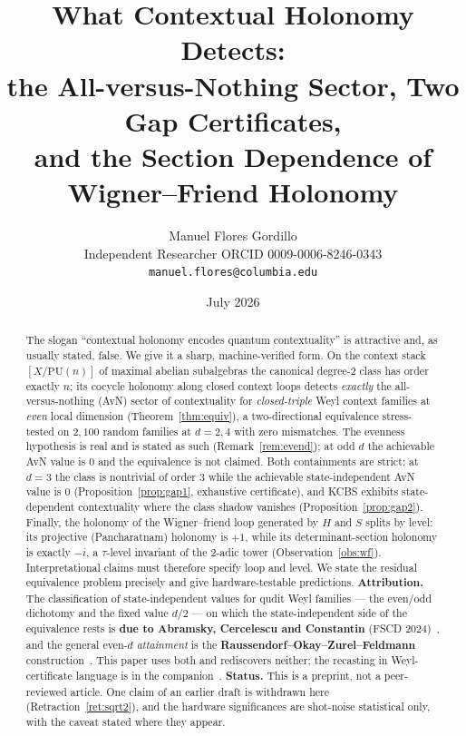 \documentclass[11pt]{article}
\title{What Contextual Holonomy Detects:\\ the All-versus-Nothing Sector, Two Gap Certificates,\\ and the Section Dependence of Wigner--Friend Holonomy}
\author{Manuel Flores Gordillo\\ \small Independent Researcher \quad ORCID 0009-0006-8246-0343\\ \small \texttt{manuel.flores@columbia.edu}}
\date{July 2026}
\theoremstyle{remark}
\theoremstyle{plain}
\newcommand{\PU}{\mathrm{PU}}
\begin{document}
\maketitle

\begin{abstract}
The slogan ``contextual holonomy encodes quantum contextuality'' is attractive and, as
usually stated, false. We give it a sharp, machine-verified form. On the context stack
$[X/\PU(n)]$ of maximal abelian subalgebras the canonical degree-2 class has order exactly
$n$; its cocycle holonomy along closed context loops detects \emph{exactly} the
all-versus-nothing (AvN) sector of contextuality for \emph{closed-triple} Weyl context
families at \emph{even} local dimension (Theorem~\ref{thm:equiv}), a two-directional equivalence stress-tested on
$2{,}100$ random families at $d=2,4$ with zero mismatches. The evenness hypothesis is real
and is stated as such (Remark~\ref{rem:evend}); at odd $d$ the achievable AvN value is $0$
and the equivalence is not claimed. Both containments are strict: at $d=3$ the class
is nontrivial of order $3$ while the achievable state-independent AvN value is $0$
(Proposition~\ref{prop:gap1}, exhaustive certificate), and KCBS exhibits state-dependent
contextuality where the class shadow vanishes (Proposition~\ref{prop:gap2}). Finally, the
holonomy of the Wigner--friend loop generated by $H$ and $S$ splits by level: its
projective (Pancharatnam) holonomy is $+1$, while its determinant-section holonomy is
exactly $-i$, a $\tau$-level invariant of the 2-adic tower
(Observation~\ref{obs:wf}). Interpretational claims must therefore specify loop and level.
We state the residual equivalence problem precisely and give hardware-testable predictions.
\textbf{Attribution.} The classification of state-independent values for qudit Weyl families
--- the even/odd dichotomy and the fixed value $d/2$ --- on which the state-independent side
of the equivalence rests is \textbf{due to Abramsky, Cercelescu and Constantin} (FSCD
2024)~\cite{ACC}, and the general even-$d$ \emph{attainment} is the \textbf{Raussendorf--Okay--Zurel--Feldmann}
construction~\cite{ROZF}. This paper uses both and rediscovers neither; the recasting in
Weyl-certificate language is in the companion~\cite{paperB}.
\textbf{Status.} This is a preprint, not a peer-reviewed article. One claim of an earlier
draft is withdrawn here (Retraction~\ref{ret:sqrt2}), and the hardware significances are
shot-noise statistical only, with the caveat stated where they appear.
\end{abstract}
\end{document}
